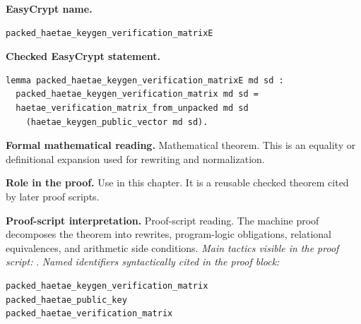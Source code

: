 \begin{formaltheorem}
\noindent\textbf{EasyCrypt name.}
\begin{lstlisting}[language=EasyCrypt,basicstyle=\ttfamily\scriptsize]
packed_haetae_keygen_verification_matrixE
\end{lstlisting}
\noindent\textbf{Checked EasyCrypt statement.}
\begin{lstlisting}[language=EasyCrypt,basicstyle=\ttfamily\scriptsize]
lemma packed_haetae_keygen_verification_matrixE md sd :
  packed_haetae_keygen_verification_matrix md sd =
  haetae_verification_matrix_from_unpacked md sd
    (haetae_keygen_public_vector md sd).
\end{lstlisting}
\noindent\textbf{Formal mathematical reading.}
Mathematical theorem. This is an equality or definitional expansion used for rewriting and normalization.

\noindent\textbf{Role in the proof.}
Use in this chapter. It is a reusable checked theorem cited by later proof scripts.

\noindent\textbf{Proof-script interpretation.}
Proof-script reading. The machine proof decomposes the theorem into rewrites, program-logic obligations, relational equivalences, and arithmetic side conditions.
\emph{Main tactics visible in the proof script:} .
\emph{Named identifiers syntactically cited in the proof block:}
\begin{lstlisting}[language=EasyCrypt,basicstyle=\ttfamily\scriptsize]
packed_haetae_keygen_verification_matrix
packed_haetae_public_key
packed_haetae_verification_matrix
\end{lstlisting}

\end{formaltheorem}

